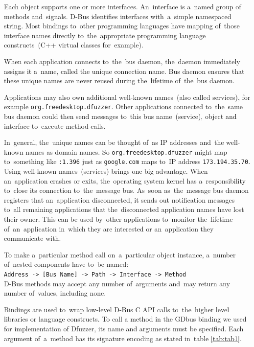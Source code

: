 \documentclass[conference]{IEEEtran}
\begin{document}
Each object supports one or more interfaces. An~interface is a~named group
of methods and~signals. D-Bus identifies interfaces with~a~simple namespaced string.
Most bindings to~other programming languages have mapping of~those interface names
directly to~the~appropriate programming language constructs~(C++ virtual classes
for~example).

When each application connects to~the~bus daemon, the~daemon immediately
assigns it a~name, called the unique connection name. Bus daemon ensures that
these unique names are never reused during the~lifetime of~the~bus daemon.

Applications may also own additional well-known names~(also called services),
for example \texttt{org.freedesktop.dfuzzer}. Other applications connected
to~the~same bus daemon could then send messages to~this bus name~(service),
object and interface to~execute method calls.

In~general, the~unique names can be thought of~as IP addresses and~the well-known
names as domain names. So \texttt{org.freedesktop.dfuzzer} might map to~something
like \texttt{:1.396} just as \texttt{google.com} maps to~IP address
\texttt{173.194.35.70}.\\

Using well-known names~(services) brings one big advantage. When an~application
crashes or exits, the~operating system kernel has a~responsibility to~close
its connection to~the~message bus. As~soon as~the~message bus daemon registers
that an~application disconnected, it sends out notification messages to~all remaining
applications that the~disconnected application names have lost their owner.
This can be used by~other applications to~monitor the~lifetime of~an~application
in~which they are interested or an~application they communicate with.

To make a~particular method call on~a~particular object instance, a~number
of~nested components have to~be named:\\

			\texttt{Address -> [Bus Name] -> Path -> Interface -> Method}\\
D-Bus methods may accept any number of~arguments
and~may return any number of~values, including none. 

Bindings are used to~wrap low-level D-Bus C API calls to~the~higher level
libraries or language constructs. To call a method in the GDbus binding we used
for implementation of Dfuzzer, its name and arguments must be specified. Each
argument of~a~method has its signature encoding as stated in~table
\ref{tab:tab1}.\\
\end{document}

